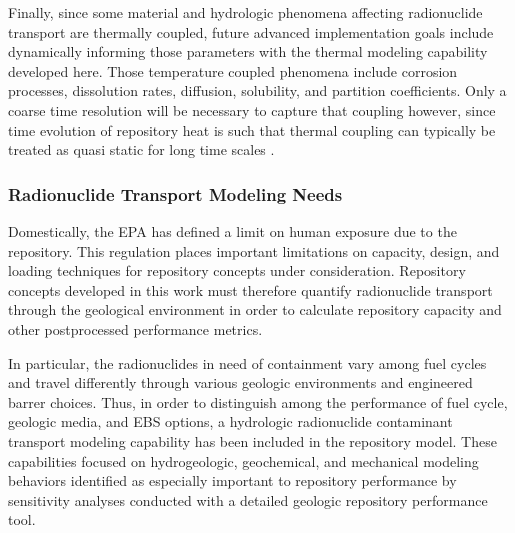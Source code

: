 Finally, since some material and hydrologic phenomena affecting radionuclide 
transport are thermally coupled, future advanced implementation goals include 
dynamically informing those parameters with the thermal modeling capability 
developed here. Those temperature coupled phenomena include corrosion 
processes, dissolution rates, diffusion, solubility, and partition 
coefficients.  Only a coarse time resolution will be necessary to capture that 
coupling however, since time evolution of repository heat is such that thermal 
coupling can typically be treated as quasi static for long time scales 
\cite{andra_argile:_2005}. 




\subsubsection{Radionuclide Transport Modeling Needs}

Domestically, the \gls{EPA} has defined a limit on  human 
exposure due to the repository. This regulation places important limitations on 
capacity, design, and loading techniques for repository concepts under 
consideration. Repository concepts developed in this work must therefore 
quantify radionuclide transport through the geological environment in order to 
calculate repository capacity and other postprocessed performance metrics. 

In particular, the radionuclides in need of containment vary among fuel cycles 
and travel differently through various geologic environments and engineered 
barrer choices. Thus, in order to distinguish among the performance of fuel 
cycle, geologic media, and \gls{EBS} options, a hydrologic radionuclide 
contaminant transport modeling capability has been included in the repository 
model.  These capabilities focused on hydrogeologic, geochemical, and 
mechanical modeling behaviors identified as especially important to repository 
performance by sensitivity analyses conducted with a detailed geologic 
repository performance tool.  


